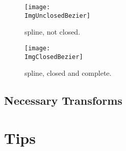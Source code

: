 		\begin{figure}[p]
		\centering
		\texttt{[image: \\ImgUnclosedBezier]}
		\caption{\dtybezieru{} spline, not closed.}
		\label{fig:first_bezier_unclosed}
		\vspace{16pt}
		\texttt{[image: \\ImgClosedBezier]}
		\caption{\dtybezieru{} spline, closed and complete.}
		\label{fig:first_bezier_closed}
		\end{figure}
		

		\subsection{Necessary Transforms}%

	\section{Tips}%


